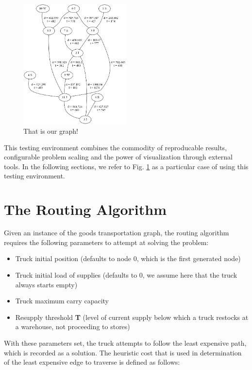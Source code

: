 \documentclass[journal,onecolumn]{IEEEtran}
\begin{document}
\begin{figure}[h]
	\centering
  	\includegraphics[width=0.5\textwidth]{img/img1.png}
  	\caption{That is our graph!}	
  	\label{fig:img1}
\end{figure}

This testing environment combines the commodity of reproducable results, configurable problem scaling and the power of visualization through external tools. In the following sections, we refer to Fig. \ref{fig:img1} as a particular case of using this testing environment.

\section{The Routing Algorithm}

Given an instance of the goods transportation graph, the routing algorithm requires the following parameters to attempt at solving the problem:
\begin{itemize}
	\item{Truck initial position (defaults to node 0, which is the first generated node)}
	\item{Truck initial load of supplies (defaults to 0, we assume here that the truck always starts empty)}
	\item{Truck maximum carry capacity}
	\item{Resupply threshold \textbf{T} (level of current supply below which a truck restocks at a warehouse, not proceeding to stores)}
\end{itemize}

With these parameters set, the truck attempts to follow the least expensive path, which is recorded as a solution. The heuristic cost that is used in determination of the least expensive edge to traverse is defined as follows: 
\end{document}
